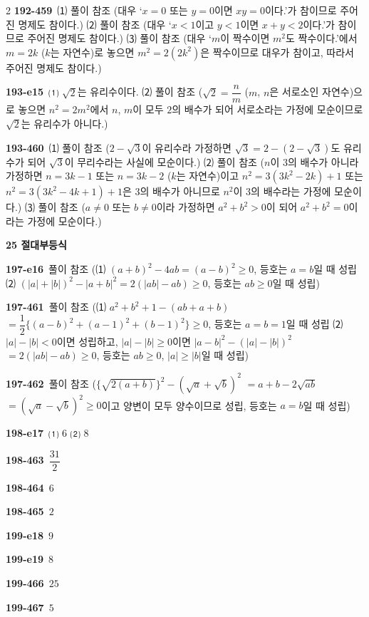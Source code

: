 \documentclass[10pt,a4paper]{article}
\begin{document}
\begin{multicols}{2}
\noindent\textbf{192-459}\ ⑴ 풀이 참조 (대우 ‘$x=0$ 또는 $y=0$이면 $xy=0$이다.’가 참이므로 주어진 명제도 참이다.) ⑵ 풀이 참조 (대우 ‘$x<1$이고 $y<1$이면 $x+y<2$이다.’가 참이므로 주어진 명제도 참이다.) ⑶ 풀이 참조 (대우 ‘$m$이 짝수이면 $m^2$도 짝수이다.’에서 $m=2k$ ($k$는 자연수)로 놓으면 $m^2=2(2k^2)$은 짝수이므로 대우가 참이고, 따라서 주어진 명제도 참이다.)\par
\noindent\textbf{193-e15}\ ⑴ $\sqrt{2}$는 유리수이다. ⑵ 풀이 참조 ($\sqrt{2}=\dfrac{n}{m}$ ($m$, $n$은 서로소인 자연수)으로 놓으면 $n^2=2m^2$에서 $n$, $m$이 모두 $2$의 배수가 되어 서로소라는 가정에 모순이므로 $\sqrt{2}$는 유리수가 아니다.)\par
\noindent\textbf{193-460}\ ⑴ 풀이 참조 ($2-\sqrt{3}$이 유리수라 가정하면 $\sqrt{3}=2-(2-\sqrt{3})$도 유리수가 되어 $\sqrt{3}$이 무리수라는 사실에 모순이다.) ⑵ 풀이 참조 ($n$이 $3$의 배수가 아니라 가정하면 $n=3k-1$ 또는 $n=3k-2$ ($k$는 자연수)이고 $n^2=3(3k^2-2k)+1$ 또는 $n^2=3(3k^2-4k+1)+1$은 $3$의 배수가 아니므로 $n^2$이 $3$의 배수라는 가정에 모순이다.) ⑶ 풀이 참조 ($a\ne 0$ 또는 $b\ne 0$이라 가정하면 $a^2+b^2>0$이 되어 $a^2+b^2=0$이라는 가정에 모순이다.)\par
\noindent\textbf{25 절대부등식}\par\smallskip
\noindent\textbf{197-e16}\ 풀이 참조 (⑴ $(a+b)^2-4ab=(a-b)^2\ge 0$, 등호는 $a=b$일 때 성립 ⑵ $(|a|+|b|)^2-|a+b|^2=2(|ab|-ab)\ge 0$, 등호는 $ab\ge 0$일 때 성립)\par
\noindent\textbf{197-461}\ 풀이 참조 (⑴ $a^2+b^2+1-(ab+a+b)$ $=\dfrac{1}{2}\{(a-b)^2+(a-1)^2+(b-1)^2\}\ge 0$, 등호는 $a=b=1$일 때 성립 ⑵ $|a|-|b|<0$이면 성립하고, $|a|-|b|\ge 0$이면 $|a-b|^2-(|a|-|b|)^2$ $=2(|ab|-ab)\ge 0$, 등호는 $ab\ge 0$, $|a|\ge|b|$일 때 성립)\par
\noindent\textbf{197-462}\ 풀이 참조 ($\{\sqrt{2(a+b)}\}^2-(\sqrt{a}+\sqrt{b})^2$ $=a+b-2\sqrt{ab}$ $=(\sqrt{a}-\sqrt{b})^2\ge 0$이고 양변이 모두 양수이므로 성립, 등호는 $a=b$일 때 성립)\par
\noindent\textbf{198-e17}\ ⑴ $6$ ⑵ $8$\par
\noindent\textbf{198-463}\ $\dfrac{31}{2}$\par
\noindent\textbf{198-464}\ $6$\par
\noindent\textbf{198-465}\ $2$\par
\noindent\textbf{199-e18}\ $9$\par
\noindent\textbf{199-e19}\ $8$\par
\noindent\textbf{199-466}\ $25$\par
\noindent\textbf{199-467}\ $5$\par

\end{multicols}
\end{document}
